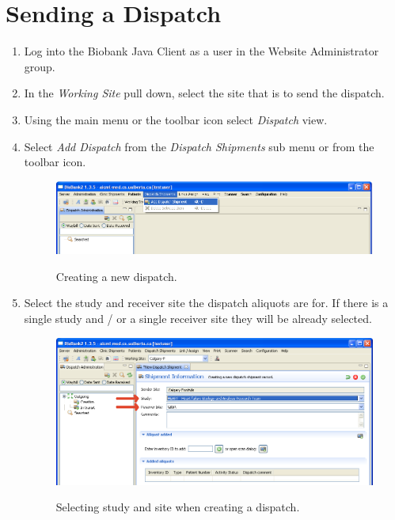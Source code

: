 \section{Sending a Dispatch}
\label{sec:dispatch_send}
\begin{enumerate}
  \item Log into the Biobank Java Client as a user in the Website
    Administrator group. %
  \item In the \emph{Working Site} pull down, select the site that is to send the
    dispatch.
  \item Using the main menu or the toolbar icon select \emph{Dispatch} view.
  \item Select \emph{Add Dispatch} from the \emph{Dispatch Shipments} sub menu
    or from the toolbar icon.
    \begin{figure}[H]
      \centering
      \scalebox{0.5}
      { \includegraphics*{screenshots/dispatch/add} }
      \caption{Creating a new dispatch.}
      \label{fig:dispatch_add}
    \end{figure}
  \item Select the study and receiver site the dispatch aliquots are for. If
    there is a single study and / or a single receiver site they will be
    already selected.
    \begin{figure}[H]
      \centering
      \scalebox{0.5}
      { \includegraphics*{screenshots/dispatch/add_entry} }
      \caption{Selecting study and site when creating a dispatch.}
      \label{fig:dispatch_add_entry}

\end{figure}
\end{enumerate}

